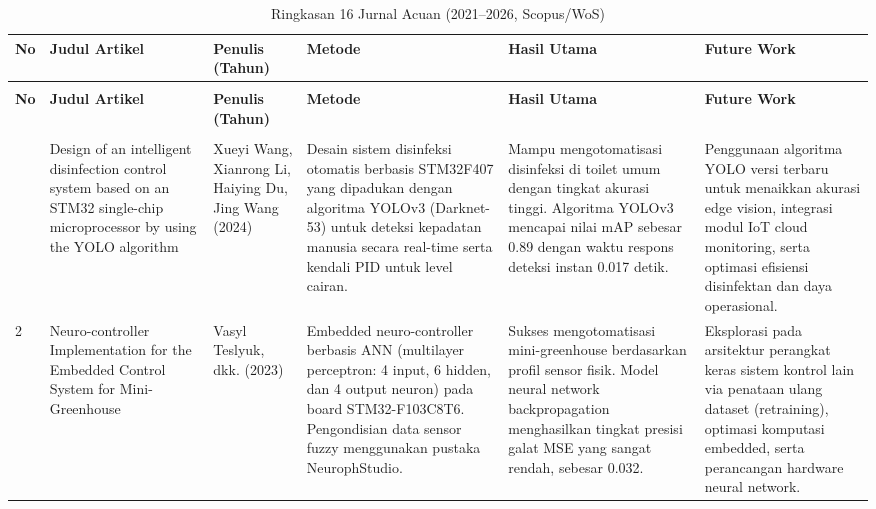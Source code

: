 \documentclass[11pt,a4paper]{article}
\begin{document}
\begin{longtable}{|>{\centering\arraybackslash}m{0.8cm}|>{\raggedright\arraybackslash}m{3.0cm}|>{\centering\arraybackslash}m{2.2cm}|>{\raggedright\arraybackslash}m{3.4cm}|>{\raggedright\arraybackslash}m{3.4cm}|>{\raggedright\arraybackslash}m{3.4cm}|}
\caption{Ringkasan 16 Jurnal Acuan (2021--2026, Scopus/WoS)} \label{tab:literatur} \\
\hline
\textbf{No} & \textbf{Judul Artikel} & \textbf{Penulis (Tahun)} & \textbf{Metode} & \textbf{Hasil Utama} & \textbf{Future Work} \\ \hline
\endfirsthead
\hline
\multicolumn{6}{|l|}{\small\textit{Lanjutan dari halaman sebelumnya}} \\ \hline
\textbf{No} & \textbf{Judul Artikel} & \textbf{Penulis (Tahun)} & \textbf{Metode} & \textbf{Hasil Utama} & \textbf{Future Work} \\ \hline
\endhead
\hline
\multicolumn{6}{|r|}{\small\textit{Bersambung ke halaman berikutnya...}} \\ \hline
\endfoot
\hline
\endlastfoot
1 & Design of an intelligent disinfection control system based on an STM32 single-chip microprocessor by using the YOLO algorithm & Xueyi Wang, Xianrong Li, Haiying Du, Jing Wang (2024) & Desain sistem disinfeksi otomatis berbasis STM32F407 yang dipadukan dengan algoritma YOLOv3 (Darknet-53) untuk deteksi kepadatan manusia secara real-time serta kendali PID untuk level cairan. & Mampu mengotomatisasi disinfeksi di toilet umum dengan tingkat akurasi tinggi. Algoritma YOLOv3 mencapai nilai mAP sebesar 0.89 dengan waktu respons deteksi instan 0.017 detik. & Penggunaan algoritma YOLO versi terbaru untuk menaikkan akurasi edge vision, integrasi modul IoT cloud monitoring, serta optimasi efisiensi disinfektan dan daya operasional. \\ \hline

2 & Neuro-controller Implementation for the Embedded Control System for Mini-Greenhouse & Vasyl Teslyuk, dkk. (2023) & Embedded neuro-controller berbasis ANN (multilayer perceptron: 4 input, 6 hidden, dan 4 output neuron) pada board STM32-F103C8T6. Pengondisian data sensor fuzzy menggunakan pustaka NeurophStudio. & Sukses mengotomatisasi mini-greenhouse berdasarkan profil sensor fisik. Model neural network backpropagation menghasilkan tingkat presisi galat MSE yang sangat rendah, sebesar 0.032. & Eksplorasi pada arsitektur perangkat keras sistem kontrol lain via penataan ulang dataset (retraining), optimasi komputasi embedded, serta perancangan hardware neural network. \\ \hline


\end{longtable}
\end{document}

